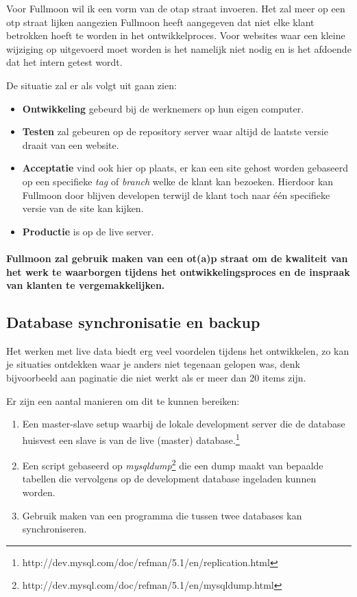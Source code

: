 \documentclass[12pt,a4paper]{article}
\begin{document}
    Voor Fullmoon wil ik een vorm van de {\sc otap} straat invoeren. Het zal meer op een {\sc otp} straat lijken aangezien Fullmoon heeft aangegeven dat niet elke klant betrokken hoeft te worden in het ontwikkelproces. Voor websites waar een kleine wijziging op uitgevoerd moet worden is het namelijk niet nodig en is het afdoende dat het intern getest wordt.
    
    De situatie zal er als volgt uit gaan zien:
    
    \begin{itemize}
      \item \textbf{Ontwikkeling} gebeurd bij de werknemers op hun eigen computer.
      \item \textbf{Testen} zal gebeuren op de repository server waar altijd de laatste versie draait van een website.
      \item \textbf{Acceptatie} vind ook hier op plaats, er kan een site gehost worden gebaseerd op een specifieke \emph{tag} of \emph{branch} welke de klant kan bezoeken. Hierdoor kan Fullmoon door blijven developen terwijl de klant toch naar \'{e}\'{e}n specifieke versie van de site kan kijken.
      \item \textbf{Productie} is op de live server.
    \end{itemize}
    
    \paragraph{Fullmoon zal gebruik maken van een {\sc ot(a)p} straat om de kwaliteit van het werk te waarborgen tijdens het ontwikkelingsproces en de inspraak van klanten te vergemakkelijken.}
    
    \subsection{Database synchronisatie en backup}
    
    Het werken met live data biedt erg veel voordelen tijdens het ontwikkelen, zo kan je situaties ontdekken waar je anders niet tegenaan gelopen was, denk bijvoorbeeld aan paginatie die niet werkt als er meer dan 20 items zijn. 
    
    Er zijn een aantal manieren om dit te kunnen bereiken:
    
    \begin{enumerate}
      \item Een master-slave setup waarbij de lokale development server die de database huisvest een slave is van de live (master) database.\footnote{ http://dev.mysql.com/doc/refman/5.1/en/replication.html}
      \item Een script gebaseerd op \emph{mysqldump}\footnote{ http://dev.mysql.com/doc/refman/5.1/en/mysqldump.html} die een dump maakt van bepaalde tabellen die vervolgens op de development database ingeladen kunnen worden.
      \item Gebruik maken van een programma die tussen twee databases kan synchroniseren.
    \end{enumerate}
    
\end{document}
